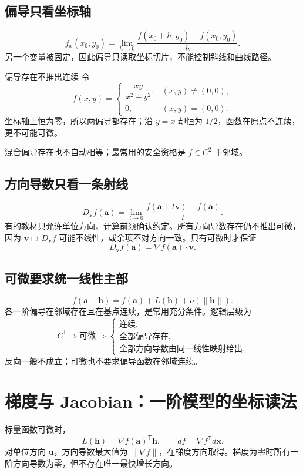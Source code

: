 \documentclass[11pt,a4paper,fontset=fandol]{ctexart}
\begin{document}
\subsection{偏导只看坐标轴}
\[
f_x(x_0,y_0)=\lim_{h\to0}\frac{f(x_0+h,y_0)-f(x_0,y_0)}h.
\]
另一个变量被固定，因此偏导只读取坐标切片，不能控制斜线和曲线路径。

\begin{warnbox}{偏导存在不推出连续}
令
\[
f(x,y)=
\begin{cases}
\dfrac{xy}{x^2+y^2},&(x,y)\ne(0,0),\\0,&(x,y)=(0,0).
\end{cases}
\]
坐标轴上恒为零，所以两偏导都存在；沿 $y=x$ 却恒为 $1/2$，函数在原点不连续，更不可能可微。
\end{warnbox}

混合偏导存在也不自动相等；最常用的安全资格是 $f\in C^2$ 于邻域。

\subsection{方向导数只看一条射线}
\[
D_{\mathbf v}f(\mathbf a)
=\lim_{t\to0}\frac{f(\mathbf a+t\mathbf v)-f(\mathbf a)}t.
\]
有的教材只允许单位方向，计算前须确认约定。所有方向导数存在仍不推出可微，因为 $\mathbf v\mapsto D_{\mathbf v}f$ 可能不线性，或余项不对方向一致。只有可微时才保证
\[
D_{\mathbf v}f(\mathbf a)=\nabla f(\mathbf a)\cdot\mathbf v.
\]

\subsection{可微要求统一线性主部}
\[
\boxed{f(\mathbf a+\mathbf h)
=f(\mathbf a)+L(\mathbf h)+o(\lVert\mathbf h\rVert)}.
\]
各一阶偏导在邻域存在且在基点连续，是常用充分条件。逻辑层级为
\[
C^1\Longrightarrow\text{可微}\Longrightarrow
\begin{cases}
\text{连续},\\
\text{全部偏导存在},\\
\text{全部方向导数由同一线性映射给出}.
\end{cases}
\]
反向一般不成立；可微也不要求偏导函数在邻域连续。

\section{梯度与 Jacobian：一阶模型的坐标读法}

标量函数可微时，
\[
L(\mathbf h)={\nabla f(\mathbf a)}^{\mathsf T}\mathbf h,
\qquad
df=\nabla f^{\mathsf T}d\mathbf x.
\]
对单位方向 $\mathbf u$，方向导数最大值为 $\lVert\nabla f\rVert$，在梯度方向取得。梯度为零时所有一阶方向导数为零，但不存在唯一最快增长方向。
\end{document}
